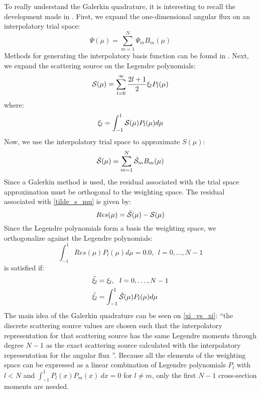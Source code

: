 To really understand the Galerkin quadrature, it is interesting to recall 
the development made in \cite{galerkin_morel}. First, we expand the
one-dimensional angular flux on an interpolatory trial space:
\begin{equation}
\Psi(\mu) = \sum_{m=1}^N \Psi_m B_m(\mu)
\label{psi_b}
\end{equation}
Methods for generating the interpolatory basis function can be found in 
\cite{galerkin_morel}. Next, we expand the scattering source on the Legendre
polynomials:
\begin{equation}
\mc{S}(\mu) = \sum_{l=0}^{\infty} \frac{2l+1}{2} \xi_l P_l(\mu)
\label{S_mu_2}
\end{equation}
where:
\begin{equation}
  \xi_l = \int_{-1}^1 \mathcal{S}(\mu) P_l(\mu) d\mu
\end{equation}
Now, we use the interpolatory trial space to approximate $S(\mu)$:
\begin{equation}
\tilde{\mc{S}}(\mu) = \sum_{m=1}^N \tilde{\mc{S}}_m B_m(\mu)
\label{tilde_s_mu}
\end{equation}
Since a Galerkin method is used, the residual associated with the trial space 
approximation must be orthogonal to the weighting
space. The residual associated with \cref{tilde_s_mu} is given by:
\begin{equation}
Res(\mu) = \tilde{\mc{S}}(\mu) - \mc{S}(\mu)
\label{R_mu}
\end{equation}
Since the Legendre polynomials form a basis the weighting space, we
orthogonalize against the Legendre polynomials:
\begin{equation}
\int_{-1}^1 Res(\mu) P_l(\mu) d\mu = 0.0,\ \ l=0,\hdots,N-1
\label{int_r_mu}
\end{equation}
 is satisfied if:
\begin{align}
&\tilde{\xi}_l = \xi_l,\ \ l=0,\hdots,N-1 \label{xi_vs_xi}\\
&\tilde{\xi}_l = \int_{-1}^1 \tilde{\mc{S}}(\mu) P_l(\mu) d\mu
\end{align}
The main idea of the Galerkin quadrature can be seen on \cref{xi_vs_xi}: ``the
discrete scattering source values are chosen such that the interpolatory
representation for that scattering source has the same Legendre moments
through degree $N-1$ as the exact scattering source calculated with the
interpolatory representation for the angular flux \cite{galerkin_morel}''. 
Because all the elements of the weighting space can be expressed as a linear
combination of Legendre polynomials $P_l$ with $l<N$ and $\int_{-1}^{1}
P_l(x)P_m(x)\ dx=0$ for $l\neq m$, only the first $N-1$ cross-section moments
are needed.

